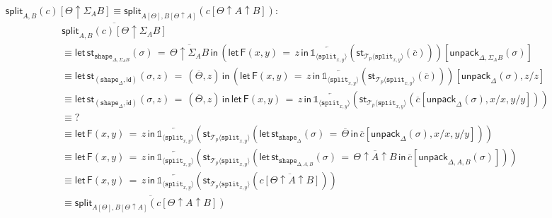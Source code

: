 \documentclass[10pt]{article}
\theoremstyle{definition}
\newcommand{\id}{\mathsf{id}}
\newcommand{\rewrite}[2]{\overleftarrow{#1}(#2)}
\newcommand\StI[2]{\ensuremath{\mathsf{st}_{#1}(#2)}}
\newcommand\StE[4]{\ensuremath{\mathsf{let} \, \StI{#1}{#3} \, = \, {#2} \, \mathsf{in} \, #4}}
\newcommand\FE[3]{\ensuremath{\mathsf{let} \, \mathsf{F}(#2) \, = \, {#1} \, \mathsf{in} \, #3}}
\newcommand\ApEl[2]{\mathcal{T}_{#1}\langle#2\rangle}
\newcommand\unpack[2]{\ensuremath{\mathsf{unpack}_{#1}(#2)}}
\newcommand{\tshape}[1]{\ensuremath{\mathtt{shape}_{#1}}}
\newcommand{\upstairs}[1]{\overline{#1}}
\newcommand\One{\ensuremath{\mathds{1}}}
\newcommand\ApOne[1]{\ensuremath{\One_{\langle {#1} \rangle }}}
\newcommand\tsplit[1]{\ensuremath{\mathtt{split}_{#1}}}
\newcommand\qsplit[1]{\ensuremath{\mathsf{split}_{#1}}}
\begin{document}
\begin{enumerate}[style = multiline, labelwidth = 80pt]
\item[{$\qsplit{A,B}(c)[\Theta \uparrow \Sigma_A B] \equiv \qsplit{A[\Theta],B[\Theta \uparrow A]}(c[\Theta \uparrow A \uparrow B])$}:]
\begin{align*}
&\upstairs{\qsplit{A,B}(c)[\Theta \uparrow \Sigma_A B]} \\
&\equiv \StE{\tshape{\Delta, \Sigma_A B}}{\upstairs{\Theta \uparrow \Sigma_A B}}{\sigma}{(\FE{z}{x,y}{\rewrite{\ApOne{\tsplit{x,y}}}{\StI{\ApEl{p}{\tsplit{x,y}}}{\upstairs{c}}}})[\unpack{\Delta, \Sigma_A B}{\sigma}]} \\
&\equiv \StE{(\tshape{\Delta}, \id)}{(\upstairs{\Theta}, z)}{\sigma, z}{(\FE{z}{x,y}{\rewrite{\ApOne{\tsplit{x,y}}}{\StI{\ApEl{p}{\tsplit{x,y}}}{\upstairs{c}}}})[\unpack{\Delta}{\sigma}, z/z]} \\
&\equiv \StE{(\tshape{\Delta}, \id)}{(\upstairs{\Theta}, z)}{\sigma, z}{\FE{z}{x,y}{\rewrite{\ApOne{\tsplit{x,y}}}{\StI{\ApEl{p}{\tsplit{x,y}}}{\upstairs{c}[\unpack{\Delta}{\sigma}, x/x,y/y]}}}} \\
&\equiv ? \\
&\equiv \FE{z}{x,y}{\rewrite{\ApOne{\tsplit{x,y}}}{\StI{\ApEl{p}{\tsplit{x,y}}}{\StE{\tshape{\Delta}}{\upstairs{\Theta}}{\sigma}{\upstairs{c}[\unpack{\Delta}{\sigma}, x/x, y/y]}}}} \\
&\equiv \FE{z}{x,y}{\rewrite{\ApOne{\tsplit{x,y}}}{\StI{\ApEl{p}{\tsplit{x,y}}}{\StE{\tshape{\Delta, A, B}}{\upstairs{\Theta \uparrow A \uparrow B}}{\sigma}{\upstairs{c}[\unpack{\Delta, A, B}{\sigma}]}}}} \\
&\equiv \FE{z}{x,y}{\rewrite{\ApOne{\tsplit{x,y}}}{\StI{\ApEl{p}{\tsplit{x,y}}}{\upstairs{c[\Theta \uparrow A \uparrow B]}}}} \\
&\equiv \upstairs{\qsplit{A[\Theta],B[\Theta \uparrow A]}(c[\Theta \uparrow A \uparrow B])}
\end{align*}


\end{enumerate}
\end{document}
